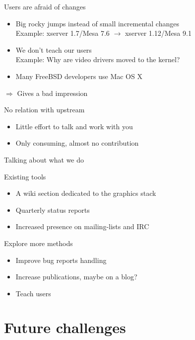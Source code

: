 \documentclass{beamer}
\begin{document}
\begin{frame}{Users are afraid of changes}
  \begin{itemize}
    \item Big rocky jumps instead of small incremental changes \\
      Example: xserver 1.7/Mesa 7.6 $\rightarrow$ xserver 1.12/Mesa 9.1
    \item We don't teach our users \\
      Example: Why are video drivers moved to the kernel?
    \item Many FreeBSD developers use Mac OS X
  \end{itemize}
  $\Rightarrow$ Gives a bad impression
\end{frame}

\begin{frame}{No relation with upstream}
  \begin{itemize}
    \item Little effort to talk and work with you
    \item Only consuming, almost no contribution
  \end{itemize}
\end{frame}

\begin{frame}{Talking about what we do}
  \begin{block}{Existing tools}
    \begin{itemize}
      \item A wiki section dedicated to the graphics stack
      \item Quarterly status reports
      \item Increased presence on mailing-lists and IRC
    \end{itemize}
  \end{block}
  \begin{block}{Explore more methods}
    \begin{itemize}
      \item Improve bug reports handling
      \item Increase publications, maybe on a blog?
      \item Teach users
    \end{itemize}
  \end{block}
\end{frame}

\section{Future challenges}
\end{document}

